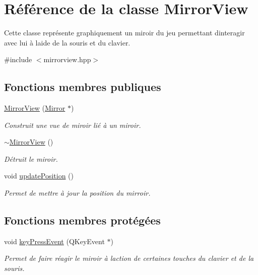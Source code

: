 \hypertarget{classMirrorView}{}\section{Référence de la classe Mirror\+View}
\label{classMirrorView}


Cette classe représente graphiquement un miroir du jeu permettant d\textquotesingle{}interagir avec lui à l\textquotesingle{}aide de la souris et du clavier.  




{\ttfamily \#include $<$mirrorview.\+hpp$>$}

\subsection*{Fonctions membres publiques}
\begin{DoxyCompactItemize}
\item 
\hyperlink{classMirrorView_adda194c3d1ae6827ba8490eb840c633a}{Mirror\+View} (\hyperlink{classMirror}{Mirror} $\ast$)
\begin{DoxyCompactList}\small\item\em Construit une vue de miroir lié à un miroir. \end{DoxyCompactList}\item 
\hyperlink{classMirrorView_addbf31b1ac8687b9587b0b24a3d89fb0}{$\sim$\+Mirror\+View} ()
\begin{DoxyCompactList}\small\item\em Détruit le miroir. \end{DoxyCompactList}\item 
void \hyperlink{classMirrorView_aa4a70f2a5c83b547631486660692ddf5}{update\+Position} ()
\begin{DoxyCompactList}\small\item\em Permet de mettre à jour la position du mirroir. \end{DoxyCompactList}\end{DoxyCompactItemize}
\subsection*{Fonctions membres protégées}
\begin{DoxyCompactItemize}
\item 
void \hyperlink{classMirrorView_a1a9563cd71dd5a8e9a94d2245121e54c}{key\+Press\+Event} (Q\+Key\+Event $\ast$)
\begin{DoxyCompactList}\small\item\em Permet de faire réagir le miroir à l\textquotesingle{}action de certaines touches du clavier et de la souris. \end{DoxyCompactList}\end{DoxyCompactItemize}
